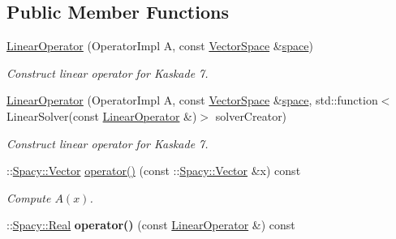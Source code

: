 \subsection*{\-Public \-Member \-Functions}
\begin{DoxyCompactItemize}
\item 
\hyperlink{classSpacy_1_1Kaskade_1_1LinearOperator_a24acb8f5c16194484d4afe5777a5aea5}{\-Linear\-Operator} (\-Operator\-Impl \-A, const \hyperlink{classSpacy_1_1VectorSpace}{\-Vector\-Space} \&\hyperlink{classSpacy_1_1VectorBase_aa999dbf9d679d895dfe04c10fbf9f5e9}{space})
\begin{DoxyCompactList}\small\item\em \-Construct linear operator for \-Kaskade 7. \end{DoxyCompactList}\item 
\hyperlink{classSpacy_1_1Kaskade_1_1LinearOperator_a5c287f9cae480a07428e49af70875b7a}{\-Linear\-Operator} (\-Operator\-Impl \-A, const \hyperlink{classSpacy_1_1VectorSpace}{\-Vector\-Space} \&\hyperlink{classSpacy_1_1VectorBase_aa999dbf9d679d895dfe04c10fbf9f5e9}{space}, std\-::function$<$ \-Linear\-Solver(const \hyperlink{classSpacy_1_1Kaskade_1_1LinearOperator}{\-Linear\-Operator} \&)$>$ solver\-Creator)
\begin{DoxyCompactList}\small\item\em \-Construct linear operator for \-Kaskade 7. \end{DoxyCompactList}\item 
\hypertarget{classSpacy_1_1Kaskade_1_1LinearOperator_added0f85104ded29f4c87992f5b5a81b}{\-::\hyperlink{classSpacy_1_1Vector}{\-Spacy\-::\-Vector} \hyperlink{classSpacy_1_1Kaskade_1_1LinearOperator_added0f85104ded29f4c87992f5b5a81b}{operator()} (const \-::\hyperlink{classSpacy_1_1Vector}{\-Spacy\-::\-Vector} \&x) const }\label{classSpacy_1_1Kaskade_1_1LinearOperator_added0f85104ded29f4c87992f5b5a81b}

\begin{DoxyCompactList}\small\item\em \-Compute $A(x)$. \end{DoxyCompactList}\item 
\hypertarget{classSpacy_1_1Kaskade_1_1LinearOperator_af787d5f0a939baeaca4732fcbb7698ad}{\-::\hyperlink{classSpacy_1_1Real}{\-Spacy\-::\-Real} {\bfseries operator()} (const \hyperlink{classSpacy_1_1Kaskade_1_1LinearOperator}{\-Linear\-Operator} \&) const }\label{classSpacy_1_1Kaskade_1_1LinearOperator_af787d5f0a939baeaca4732fcbb7698ad}


\end{DoxyCompactItemize}
